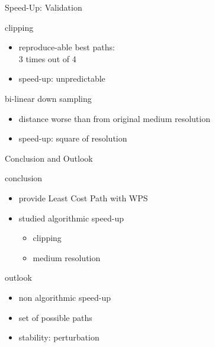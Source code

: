 \documentclass[usenames,dvipsnames,aspectratio=169]{beamer}
\begin{document}
	\begin{frame}{Speed-Up: Validation}
		\begin{minipage}[t]{0.48\textwidth}
			clipping
			\begin{itemize}
				\item reproduce-able best paths:\\ 3 times out of 4
				\item speed-up: unpredictable
			\end{itemize}
		\end{minipage}
		\hfill	
		\begin{minipage}[t]{0.48\textwidth}
			bi-linear down sampling
			\begin{itemize}
				\item distance worse than from original medium resolution
				\item speed-up: square of resolution
			\end{itemize}
		\end{minipage}
	\end{frame}

	\begin{frame}{Conclusion and Outlook}

	\begin{minipage}[t]{0.48\textwidth}
		conclusion
		\begin{itemize}
			\item provide Least Cost Path with WPS
			\item studied algorithmic speed-up
			     \begin{itemize}
			     	\item clipping
			     	\item medium resolution
			     \end{itemize}
		\end{itemize}
	\end{minipage}
	\hfill	
	\begin{minipage}[t]{0.48\textwidth}
		outlook
		\begin{itemize}
			\item non algorithmic speed-up
			\item set of possible paths
			\item stability: perturbation
		\end{itemize}
	\end{minipage}
	\end{frame}
\end{document}
